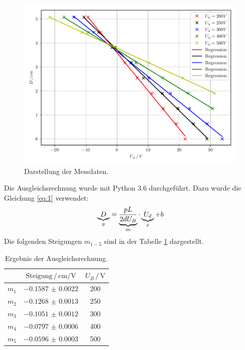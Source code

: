 \begin{figure}[H]
  \centering
  \includegraphics[width=\textwidth]{plot1.pdf}
  \caption{Darstellung der Messdaten.}
  \label{abb:6}
\end{figure}
Die Ausgleichsrechnung wurde mit Python 3.6 durchgeführt.
Dazu wurde die Gleichung \ref{eq:1} verwendet:
\begin{equation*}
  \underbrace{D}_{\mathclap{y}} = \underbrace{\frac{pL}{2dU_B}}_{\mathclap{m}} \cdot \underbrace{U_d}_{\mathclap{x}} + b
\end{equation*}
Die folgenden Steigungen $m_{1-5}$ sind in der Tabelle \ref{tab:2} dargestellt.

\begin{table}[H]
  \centering
  \caption{Ergebnis der Ausgleichsrechnung.}
  \label{tab:2}
  \begin{tabular}{c c c}
\toprule
&$\text{Steigung} \,/\, \si{\centi\meter\per\volt}$& $U_B \, /\, \si{\volt}$\\
\midrule
$m_1$ & $\num{-0.1587(22)}$& 200\\
$m_2$ & $\num{-0.1268(13)}$& 250\\
$m_3$ & $\num{-0.1051(12)}$& 300\\
$m_4$ & $\num{-0.0797(6)}$ & 400\\
$m_5$ & $\num{-0.0596(3)}$ & 500\\
\bottomrule
  \end{tabular}
\end{table}


